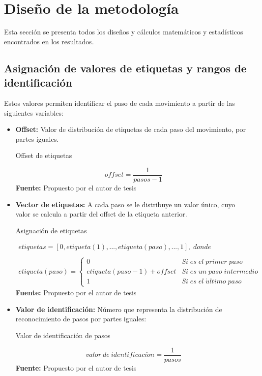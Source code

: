 \section{Dise\~no de la metodolog\'ia}\label{dis}
Esta secci\'on se presenta todos los dise\~nos y c\'alculos matem\'aticos y estad\'isticos encontrados en los resultados. 
\subsection{Asignaci\'on de valores de etiquetas y rangos de identificaci\'on}\label{dis:asig}
Estos valores permiten identificar el paso de cada movimiento a partir de las siguientes variables:
\begin{itemize}
\item \textbf{Offset:} Valor de distribuci\'on de etiquetas de cada paso del movimiento, por partes iguales.
\begin{formula}[H]
	\centering
	\caption{Offset de etiquetas}
	\label{frm:offsetEt}
	\begin{equation}
offset = \frac{1}{pasos-1}
	\end{equation}
	\textbf{Fuente:} Propuesto por el autor de tesis
\end{formula}
\item \textbf{Vector de etiquetas:} A cada paso se le distribuye un valor \'unico, cuyo valor se calcula a partir del offset de la etiqueta anterior.
\begin{formula}[H]
	\centering
	\caption{Asignaci\'on de etiquetas}
	\label{frm:vecEtiq}
	\begin{equation}
\begin{matrix}
etiquetas=[0, etiqueta(1), ..., etiqueta(paso), ..., 1],\; donde
\\
\\
etiqueta(paso) =
\left\{\begin{matrix}
0 & Si\; es\; el\; primer \; paso
\\
etiqueta(paso-1)+offset & Si\; es\; un\; paso\; intermedio
\\ 
1 & Si\; es\; el\; \acute{u}ltimo\; paso
\end{matrix}\right.
\end{matrix}
	\end{equation}
	\textbf{Fuente:} Propuesto por el autor de tesis
\end{formula} 

\item \textbf{Valor de identificaci\'on:} N\'umero que representa la distribuci\'on de reconocimiento  de pasos por partes iguales:
\begin{formula}[H]
	\centering
	\caption{Valor de identificaci\'on de pasos}
	\label{frm:idenStep}
	\begin{equation}
valor \: de \: identificaci\acute{o}n = \frac{1}{pasos}
	\end{equation}
	\textbf{Fuente:} Propuesto por el autor de tesis
\end{formula} 


\end{itemize}
